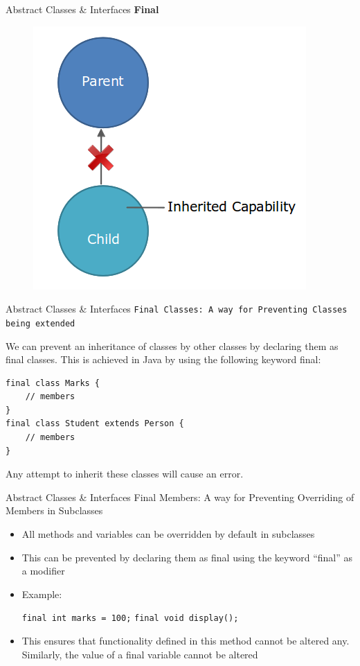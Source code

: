 \documentclass[14pt]{beamer}
\begin{document}
\begin{frame}{Abstract Classes \& Interfaces}
 \textbf{Final}
 \begin{figure}[H]
 \centering
 \includegraphics[scale=.4]{final.png}
 \end{figure}
\end{frame}

\begin{frame}[fragile]{Abstract Classes \& Interfaces}
 \texttt{Final Classes: A way for Preventing Classes being extended}
 
 We can prevent an inheritance of classes by other classes by declaring them as final classes. This is achieved in Java by using the following keyword final:
 \begin{lstlisting}[numbers=none, frame=single, basicstyle=\tiny]
final class Marks { 
    // members
}
final class Student extends Person { 
    // members
}
\end{lstlisting}
Any attempt to inherit these classes will cause an error.
\end{frame}

\begin{frame}{Abstract Classes \& Interfaces}
Final Members: A way for Preventing Overriding of Members in Subclasses
\begin{itemize}
 \item All methods and variables can be overridden by default in subclasses
 \item This can be prevented by declaring them as final using the keyword ``final'' as a modifier
 \item Example:
 
  \lstinline!final int marks = 100;!
  \lstinline!final void display();!
  \item This ensures that functionality defined in this method cannot be altered any. Similarly, the value of a final variable cannot be altered
 
\end{itemize}
\end{frame}
\end{document}
